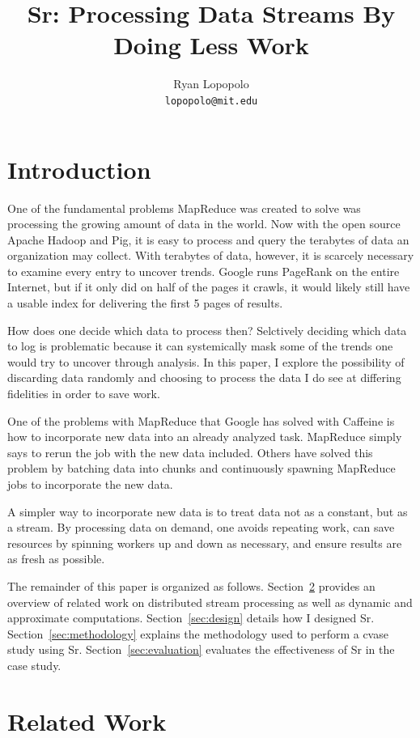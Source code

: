 \documentclass[12pt]{article}
\title{Sr: Processing Data Streams By Doing Less Work}
\author{Ryan Lopopolo\\
\texttt{lopopolo@mit.edu}}
\begin{document}
\twocolumn
\maketitle

\section{Introduction}
\label{sec:intro}
One of the fundamental problems MapReduce was created to solve was processing the growing amount of data in the world. Now with the open source Apache Hadoop and Pig, it is easy to process and query the terabytes of data an organization may collect. With terabytes of data, however, it is scarcely necessary to examine every entry to uncover trends. Google runs PageRank on the entire Internet, but if it only did on half of the pages it crawls, it would likely still have a usable index for delivering the first 5 pages of results.

How does one decide which data to process then? Selctively deciding which data to log is problematic because it can systemically mask some of the trends one would try to uncover through analysis. In this paper, I explore the possibility of discarding data randomly and choosing to process the data I do see at differing fidelities in order to save work.

One of the problems with MapReduce that Google has solved with Caffeine is how to incorporate new data into an already analyzed task. MapReduce simply says to rerun the job with the new data included. Others have solved this problem by batching data into chunks and continuously spawning MapReduce jobs to incorporate the new data.

A simpler way to incorporate new data is to treat data not as a constant, but as a stream. By processing data on demand, one avoids repeating work, can save resources by spinning workers up and down as necessary, and ensure results are as fresh as possible.

The remainder of this paper is organized as follows. Section~\ref{sec:relwork} provides an overview of related work on distributed stream processing as well as dynamic and approximate computations. Section~\ref{sec:design} details how I designed Sr. Section~\ref{sec:methodology} explains the methodology used to perform a cvase study using Sr. Section~\ref{sec:evaluation} evaluates the effectiveness of Sr in the case study.

\section{Related Work}
\label{sec:relwork}
\end{document}
